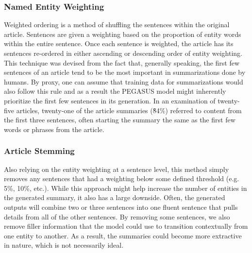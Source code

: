 \documentclass[12pt]{report}
\begin{document}
            \subsubsection{Named Entity Weighting}
                Weighted ordering is a method of shuffling the sentences within the original article. Sentences are given a weighting based on the proportion of entity words within the entire sentence. Once each sentence is weighted, the article has its sentences re-ordered in either ascending or descending order of entity weighting. This technique was devised from the fact that, generally speaking, the first few sentences of an article tend to be the most important in summarizations done by humans. By proxy, one can assume that training data for summarizations would also follow this rule and as a result the PEGASUS model might inherently prioritize the first few sentences in its generation. In an examination of twenty-five articles, twenty-one of the article summaries (\~84\%) referred to content from the first three sentences, often starting the summary the same as the first few words or phrases from the article.
            
            
            \subsubsection{Article Stemming}
                Also relying on the entity weighting at a sentence level, this method simply removes any sentences that had a weighting below some defined threshold (e.g. 5\%, 10\%, etc.). While this approach might help increase the number of entities in the generated summary, it also has a large downside. Often, the generated outputs will combine two or three sentences into one fluent sentence that pulls details from all of the other sentences. By removing some sentences, we also remove filler information that the model could use to transition contextually from one entity to another. As a result, the summaries could become more extractive in nature, which is not necessarily ideal. 

        
\end{document}
